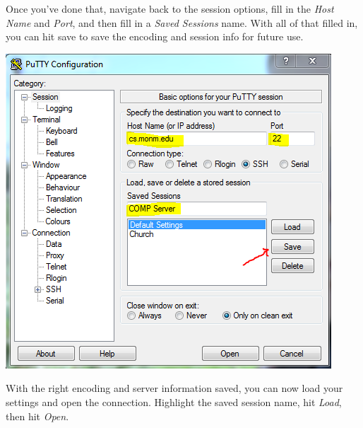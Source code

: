 \documentclass[]{tufte-handout}
\begin{document}
Once you've done that, navigate back to the session options, fill in the \textit{Host Name} and \textit{Port}, and then fill in a \textit{Saved Sessions} name. With all of that filled in, you can hit save to save the encoding and session info for future use.

\vspace{.1in}
\begin{center}
\includegraphics[scale=.75]{Putty-SaveSettings.png}
\end{center}
\vspace{.1in}

With the right encoding and server information saved, you can now load your settings and open the connection. Highlight the saved session name, hit \textit{Load}, then hit \textit{Open}. 
\end{document}
